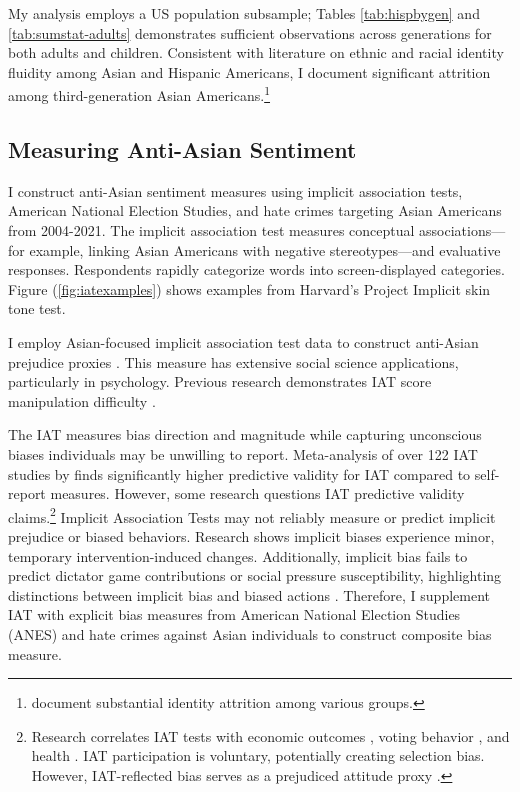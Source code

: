 My analysis employs a US population subsample; Tables \ref{tab:hispbygen} and \ref{tab:sumstat-adults} demonstrates sufficient observations across generations for both adults and children. Consistent with literature on ethnic and racial identity fluidity among Asian and Hispanic Americans, I document significant attrition among third-generation Asian Americans.\footnote{\textcite{duncanIdentifyingLaterGenerationDescendants2018,duncanSocioeconomicIntegrationImmigrant2018, antmanEthnicAttritionObserved2016,antmanEthnicAttritionAssimilation2020} document substantial identity attrition among various groups.}

\subsection{Measuring Anti-Asian Sentiment}\label{sub:lw-bias}

I construct anti-Asian sentiment measures using implicit association tests, American National Election Studies, and hate crimes targeting Asian Americans from 2004-2021. The implicit association test measures conceptual associations—for example, linking Asian Americans with negative stereotypes—and evaluative responses. Respondents rapidly categorize words into screen-displayed categories. Figure (\ref{fig:iatexamples}) shows examples from Harvard's Project Implicit skin tone test.

I employ Asian-focused implicit association test data to construct anti-Asian prejudice proxies \autocite{greenwaldMeasuringIndividualDifferences1998}. This measure has extensive social science applications, particularly in psychology. Previous research demonstrates IAT score manipulation difficulty \autocite{egloffPredictiveValidityImplicit2002}.

The IAT measures bias direction and magnitude while capturing unconscious biases individuals may be unwilling to report. Meta-analysis of over 122 IAT studies by \textcite{greenwaldMeasuringIndividualDifferences1998} finds significantly higher predictive validity for IAT compared to self-report measures. However, some research questions IAT predictive validity claims.\footnote{Research correlates IAT tests with economic outcomes \autocite{chettyRaceEconomicOpportunity2020,gloverDiscriminationSelfFulfillingProphecy2017}, voting behavior \autocite{friesePredictingVotingBehavior2007}, and health \autocite{leitnerRacialBiasAssociated2016}. IAT participation is voluntary, potentially creating selection bias. However, IAT-reflected bias serves as a prejudiced attitude proxy \autocite{chettyRaceEconomicOpportunity2020}.} Implicit Association Tests may not reliably measure or predict implicit prejudice or biased behaviors. Research shows implicit biases experience minor, temporary intervention-induced changes. Additionally, implicit bias fails to predict dictator game contributions or social pressure susceptibility, highlighting distinctions between implicit bias and biased actions \autocite{arkesAttributionsImplicitPrejudice2004,forscherMetaanalysisProceduresChange2019,leeDoesImplicitBias2018}. Therefore, I supplement IAT with explicit bias measures from American National Election Studies (ANES) and hate crimes against Asian individuals to construct composite bias measure.

